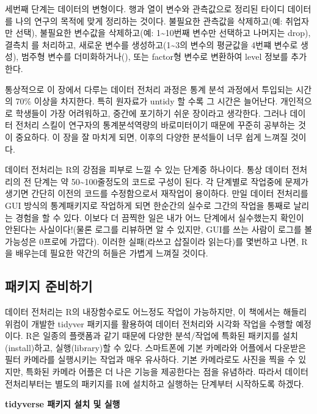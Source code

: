 \documentclass[
]{book}
\theoremstyle{definition}
\theoremstyle{definition}
\theoremstyle{definition}
\theoremstyle{definition}
\theoremstyle{remark}
\begin{document}
세번째 단계는 데이터의 변형이다. 행과 열이 변수와 관측값으로 정리된 타이디 데이터를 나의 연구의 목적에 맞게 정리하는 것이다. 불필요한 관측값을 삭제하고(예: 취업자만 선택), 불필요한 변수값을 삭제하고(예: 1\textasciitilde10번째 변수만 선택하고 나머지는 drop), 결측치 를 처리하고, 새로운 변수를 생성하고(1\textasciitilde3의 변수의 평균값을 4번쨰 변수로 생성), 범주형 변수를 더미화하거나(), 또는 factor형 변수로 변환하여 level 정보를 추가한다.

통상적으로 이 장에서 다루는 데이터 전처리 과정은 통계 분석 과정에서 투입되는 시간의 70\% 이상을 차지한다. 특히 원자료가 untidy 할 수록 그 시간은 늘어난다. 개인적으로 학생들이 가장 어려워하고, 중간에 포기하기 쉬운 장이라고 생각한다. 그러나 데이터 전처리 스킬이 연구자의 통계분석역량의 바로미터이기 때문에 꾸준히 공부하는 것이 중요하다. 이 장을 잘 마치게 되면, 이후의 다양한 분석들이 너무 쉽게 느껴질 것이다.

데이터 전처리는 R의 강점을 피부로 느낄 수 있는 단계중 하나이다. 통상 데이터 전처리의 전 단계는 약 50\textasciitilde100줄정도의 코드로 구성이 된다. 각 단계별로 작업중에 문제가 생기면 간단히 이전의 코드를 수정함으로서 재작업이 용이하다.
만일 데이터 전처리를 GUI 방식의 통계패키지로 작업하게 되면 한순간의 실수로 그간의 작업을 통째로 날리는 경험을 할 수 있다. 이보다 더 끔찍한 일은 내가 어느 단계에서 실수했는지 확인이 안된다는 사실이다!(물론 로그를 리뷰하면 알 수 있지만, GUI를 쓰는 사람이 로그를 볼 가능성은 0프로에 가깝다). 이러한 실패(라쓰고 삽질이라 읽는다)를 몇번하고 나면, R을 배우는데 필요한 약간의 허들은 가볍게 느껴질 것이다.

\hypertarget{uxd328uxd0a4uxc9c0-uxc900uxbe44uxd558uxae30}{%
\subsection{패키지 준비하기}\label{uxd328uxd0a4uxc9c0-uxc900uxbe44uxd558uxae30}}

데이터 전처리는 R의 내장함수로도 어느정도 작업이 가능하지만, 이 책에서는 해들리 위컴이 개발한 tidyver 패키지를 활용하여 데이터 전처리와 시각화 작업을 수행할 예정이다.
R은 일종의 플랫폼과 같기 때문에 다양한 분석/작업에 특화된 패키지를 설치(install)하고, 실행(library)할 수 있다. 스마트폰에 기본 카메라와 어플에서 다운받은 필터 카메라를 실행시키는 작업과 매우 유사하다. 기본 카메라로도 사진을 찍을 수 있지만, 특화된 카메라 어플은 더 나은 기능을 제공한다는 점을 유념하라. 따라서 데이터 전처리부터는 별도의 패키지를 R에 설치하고 실행하는 단계부터 시작하도록 하겠다.

\textbf{tidyverse 패키지 설치 및 실행}
\end{document}
